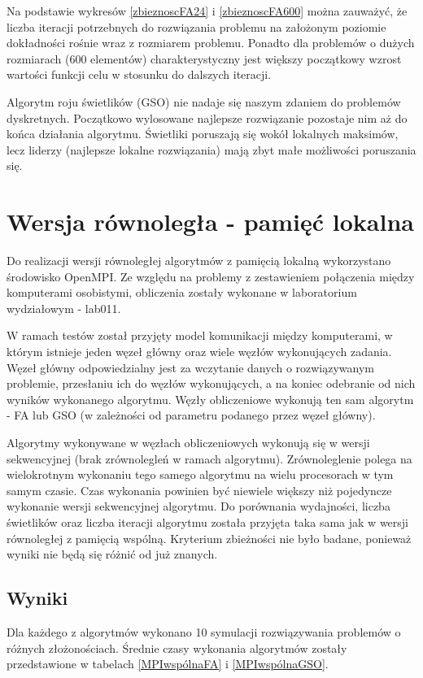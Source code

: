 \documentclass[11pt,a4paper,twoside]{article}
\begin{document}
Na podstawie wykresów \ref{zbieznoscFA24} i \ref{zbieznoscFA600} można zauważyć, że liczba iteracji potrzebnych do rozwiązania problemu na założonym poziomie dokładności rośnie wraz z rozmiarem problemu. Ponadto dla problemów o dużych rozmiarach (600 elementów) charakterystyczny jest większy początkowy wzrost wartości funkcji celu w stosunku do dalszych iteracji.

Algorytm roju świetlików (GSO) nie nadaje się naszym zdaniem do problemów dyskretnych. Początkowo wylosowane najlepsze rozwiązanie pozostaje nim aż do końca działania algorytmu. Świetliki poruszają się wokół lokalnych maksimów, lecz liderzy (najlepsze lokalne rozwiązania) mają zbyt małe możliwości poruszania się.

\section{Wersja równoległa - pamięć lokalna}
Do realizacji wersji równoległej algorytmów z pamięcią lokalną wykorzystano środowisko OpenMPI. Ze względu na problemy z zestawieniem połączenia między komputerami osobistymi, obliczenia zostały wykonane w laboratorium wydziałowym - lab011.

W ramach testów został przyjęty model komunikacji między komputerami, w którym istnieje jeden węzeł główny oraz wiele węzłów wykonujących zadania. Węzeł główny odpowiedzialny jest za wczytanie danych o rozwiązywanym problemie, przesłaniu ich do węzłów wykonujących, a na koniec odebranie od nich wyników wykonanego algorytmu. Węzły obliczeniowe wykonują ten sam algorytm - FA lub GSO (w zależności od parametru podanego przez węzeł główny).

Algorytmy wykonywane w węzłach obliczeniowych wykonują się w wersji sekwencyjnej (brak zrównolegleń w ramach algorytmu). Zrównoleglenie polega na wielokrotnym wykonaniu tego samego algorytmu na wielu procesorach w tym samym czasie. Czas wykonania powinien być niewiele większy niż pojedyncze wykonanie wersji sekwencyjnej algorytmu. Do porównania wydajności, liczba świetlików oraz liczba iteracji algorytmu została przyjęta taka sama jak w wersji równoległej z pamięcią wspólną. Kryterium zbieżności nie było badane, ponieważ wyniki nie będą się różnić od już znanych.

\subsection{Wyniki}
Dla każdego z algorytmów wykonano 10 symulacji rozwiązywania problemów o różnych złożonościach. Średnie czasy wykonania algorytmów zostały przedstawione w tabelach \ref{MPIwspólnaFA} i \ref{MPIwspólnaGSO}.
\end{document}
